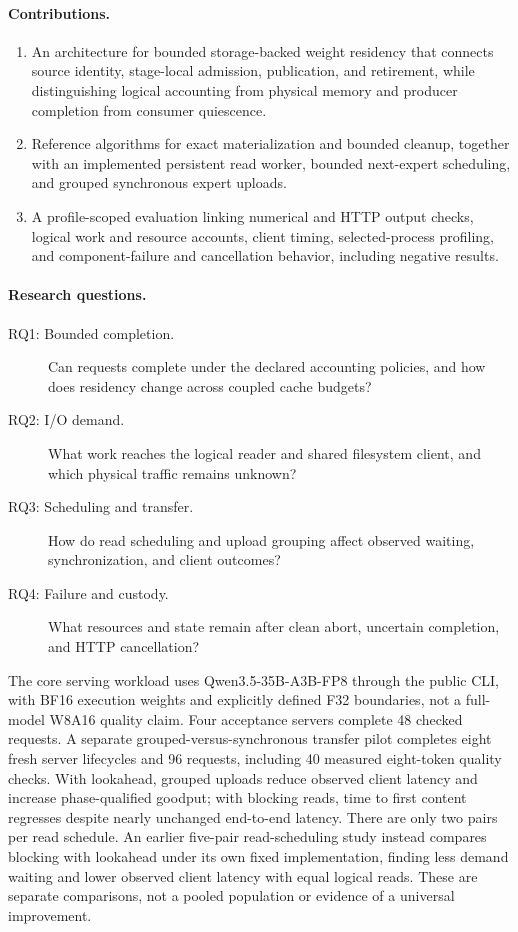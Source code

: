 \paragraph{Contributions.}
\begin{enumerate}
  \item An architecture for bounded storage-backed weight residency that connects
  source identity, stage-local admission, publication, and retirement, while
  distinguishing logical accounting from physical memory and producer completion
  from consumer quiescence.
  \item Reference algorithms for exact materialization and bounded cleanup,
  together with an implemented persistent read worker, bounded next-expert
  scheduling, and grouped synchronous expert uploads.
  \item A profile-scoped evaluation linking numerical and HTTP output checks,
  logical work and resource accounts, client timing, selected-process profiling,
  and component-failure and cancellation behavior, including negative results.
\end{enumerate}

\paragraph{Research questions.}
\begin{description}
  \item[RQ1: Bounded completion.] Can requests complete under the declared
  accounting policies, and how does residency change across coupled cache budgets?
  \item[RQ2: I/O demand.] What work reaches the logical reader and shared
  filesystem client, and which physical traffic remains unknown?
  \item[RQ3: Scheduling and transfer.] How do read scheduling and upload grouping
  affect observed waiting, synchronization, and client outcomes?
  \item[RQ4: Failure and custody.] What resources and state remain after
  clean abort, uncertain completion, and HTTP cancellation?
\end{description}

The core serving workload uses Qwen3.5-35B-A3B-FP8 through the public CLI,
with BF16 execution weights and explicitly defined F32 boundaries, not a
full-model W8A16 quality claim. Four acceptance servers complete 48 checked
requests. A separate grouped-versus-synchronous transfer pilot completes eight
fresh server lifecycles and 96 requests, including 40 measured eight-token
quality checks. With lookahead, grouped uploads reduce observed client latency
and increase phase-qualified goodput; with blocking reads, time to first content
regresses despite nearly unchanged end-to-end latency. There are only two
pairs per read schedule. An earlier five-pair read-scheduling study instead
compares blocking with lookahead under its own fixed implementation, finding
less demand waiting and lower observed client latency with equal logical reads.
These are separate comparisons, not a pooled population or evidence of a
universal improvement.

